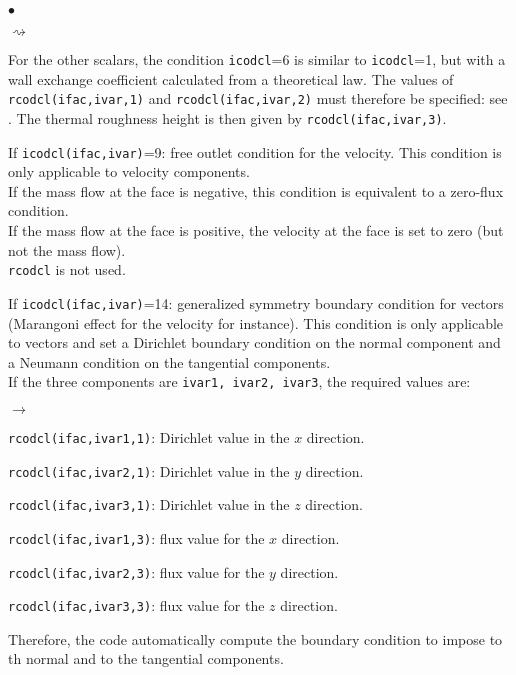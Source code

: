 {{{\begin{list}{$\bullet$}{}
\begin{list}{$\rightsquigarrow$}{}
\item For the other scalars, the condition \texttt{icodcl}=6 is similar to
      \texttt{icodcl}=1, but with a wall exchange coefficient calculated from a
      theoretical law. The values of \texttt{rcodcl(ifac,ivar,1)} and
      \texttt{rcodcl(ifac,ivar,2)} must therefore be specified: see \cite{theory}.
      The thermal roughness height is then given by \texttt{rcodcl(ifac,ivar,3)}.
\end{list}

\item If \texttt{icodcl(ifac,ivar)}=9: free outlet condition for the
      velocity. This condition is only applicable to velocity
      components.\\
      If the mass flow at the face is negative, this condition is equivalent
      to a zero-flux condition.\\
      If the mass flow at the face is positive, the velocity at the face is set to zero (but not the mass flow).\\
\texttt{rcodcl} is not used.

\item If \texttt{icodcl(ifac,ivar)}=14: generalized symmetry boundary condition for vectors (Marangoni      
      effect for the velocity for instance). 
      This condition is only applicable to vectors and set a Dirichlet boundary condition on the normal
      component and a Neumann condition on the tangential components.\\
      If the three components are  \texttt{ivar1, ivar2, ivar3}, the required values are:

\begin{list}{$\rightarrow$}{}
      \item \texttt{rcodcl(ifac,ivar1,1)}: Dirichlet value in the $x$ direction.
      \item \texttt{rcodcl(ifac,ivar2,1)}: Dirichlet value in the $y$ direction.
      \item \texttt{rcodcl(ifac,ivar3,1)}: Dirichlet value in the $z$ direction.
      \item \texttt{rcodcl(ifac,ivar1,3)}: flux value for the $x$ direction.
      \item \texttt{rcodcl(ifac,ivar2,3)}: flux value for the $y$ direction.
      \item \texttt{rcodcl(ifac,ivar3,3)}: flux value for the $z$ direction.
\end{list}
      Therefore, the code automatically compute the boundary condition to impose to th normal and to
      the tangential components.


\end{list}}}}
